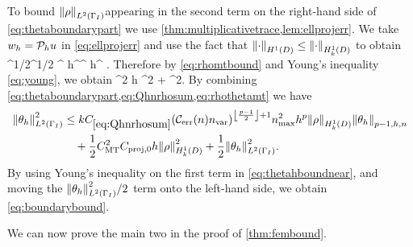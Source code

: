 To bound $\NLtGI{\rho}$appearing in  the second term on the right-hand side of \cref{eq:thetaboundarypart} we use \cref{thm:multiplicativetrace,lem:ellprojerr}. We take $w_{h} = \mathcal P_{h} u$ in \cref{eq:ellprojerr} and use the fact that $\NHoD{\cdot} \leq \NHokD{\cdot}$ to obtain
\beq\label{eq:rhomtbound}
\NLtGI{\rho} \leq \CMT\NHoD{\rho}^{1/2}\NLtD{\rho}^{1/2} \leq \CMT {}^{\half} h^\half \NHoD{\rho}\leq \CMT {}^{\half} h^{\half} \NHokD{\rho}.
\eeq
Therefore by \cref{eq:rhomtbound} and Young's inequality \cref{eq:young}, we obtain
\beq\label{eq:rhothetamt}
\NLtGI{\rho}\NLtGI{\thetah} \leq \half \CMT^2  h \NHokD{\rho}^2 + \half \NLtGI{\thetah}^2.
\eeq
By combining \cref{eq:thetaboundarypart,eq:Qhnrhosum,eq:rhothetamt} we have
\begin{align}
\NLtGI{\thetah}^2 &\leq k \Cmess \mleft(\En\nvar\mright)^{\floor{\frac{p-1}2}+1}\nmax^2 h^p \NHokD{\rho}\Nfn{p-1,h,n}{\thetah}\nonumber\\
&\quad+ \half \CMT^2 \Cprojfn{0} h\NHokD{\rho}^2 + \half \NLtGI{\thetah}^2.\label{eq:thetahboundnear}
\end{align}
By using Young's inequality on the first term in \cref{eq:thetahboundnear}, and moving the $\NLtGI{\thetah}^2/2$ term onto the left-hand side, we obtain \cref{eq:boundarybound}.
\epf

We can now prove the main two  in the proof of \cref{thm:fembound}.

\label{lem:higherbound}

\

